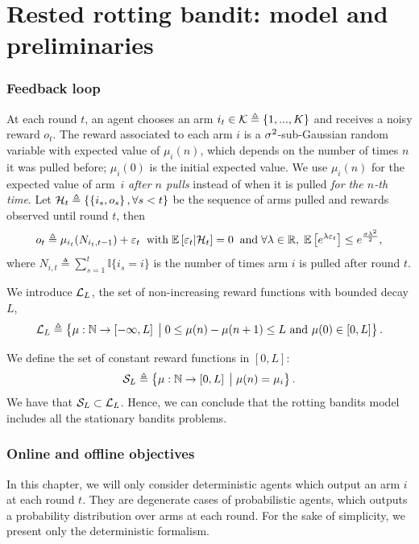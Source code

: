 \section{Rested rotting bandit: model and preliminaries}
\label{sec:rested-model}

\subsubsection*{Feedback loop}
At each round $t$, an agent chooses an arm $i_t \in \mathcal{K} \triangleq \left\{ 1, ... , K\right\} $ and receives a noisy reward $o_t$. The reward associated to each arm $i$ is a $\sigma^2$-sub-Gaussian random variable with expected value of $\mu_i(n)$, which depends on the number of times $n$ it was pulled before; $\mu_i(0)$ is the initial expected value.
We use $\mu_i(n)$ for the expected value of arm~$i$ \textit{after $n$ pulls} instead of when it is pulled \textit{for the $n$-th time}. 
Let $\mathcal{H}_t \triangleq \left\{ \left\{ i_s, o_s \right\}, \forall s < t \right\}$ be the sequence of arms pulled and rewards observed until round $t$, then 
%
\begin{equation}
\label{eq:rested-feedback}
o_{t} \triangleq \mu_{i_t}(N_{i_t,t-1}) + \varepsilon_t
 \;\; \text{with}\; \mathbb{E}\left[ \varepsilon_t | \mathcal{H}_t \right]= 0 \;\; \text{and} \; \forall \lambda \in \mathbb{R}, \; \mathbb{E}\left[ e^{\lambda\varepsilon_t}\right] \leq e^{\frac{\sigma\lambda^2}{2}},
\end{equation}
%
where $N_{i,t}\triangleq \sum_{s\!=\!1}^{t} \mathbb{I}\{i_s \!=\! i\}$ is the number of times arm $i$ is pulled after round $t$.
\begin{definition}\label{def:rew-bounded-decay} 
We introduce $\mathcal{L}_L$, the set of non-increasing reward functions with bounded decay $L$,
\[ 
\mathcal{L}_L \triangleq \left\{ \mu : {\mathbb N} \rightarrow \left[- \infty,  L\right] \;\big{|}\; 0 \leq \mu(n) - \mu(n+1)  \leq L \text{ and } \mu(0) \in \left[0,  L\right] \right\}.
\]
\end{definition}
%
\begin{remark}
We define the set of constant reward functions in $\left[0, L\right]$: 
\[ 
\mathcal{S}_L \triangleq \left\{ \mu : {\mathbb N} \rightarrow \left[0,  L\right] \;\big{|}\;  \mu(n) = \mu_i  \right\}.
\]
We have that $\mathcal{S}_L \subset \mathcal{L}_L$. Hence, we can conclude that the rotting bandits model includes all the stationary bandits problems.
\end{remark}
%
\subsubsection*{Online and offline objectives}
In this chapter, we will only consider deterministic agents which output an arm $i$ at each round $t$. They are degenerate cases of probabilistic agents, which outputs a probability distribution over arms at each round. For the sake of simplicity, we present only the deterministic formalism.   

